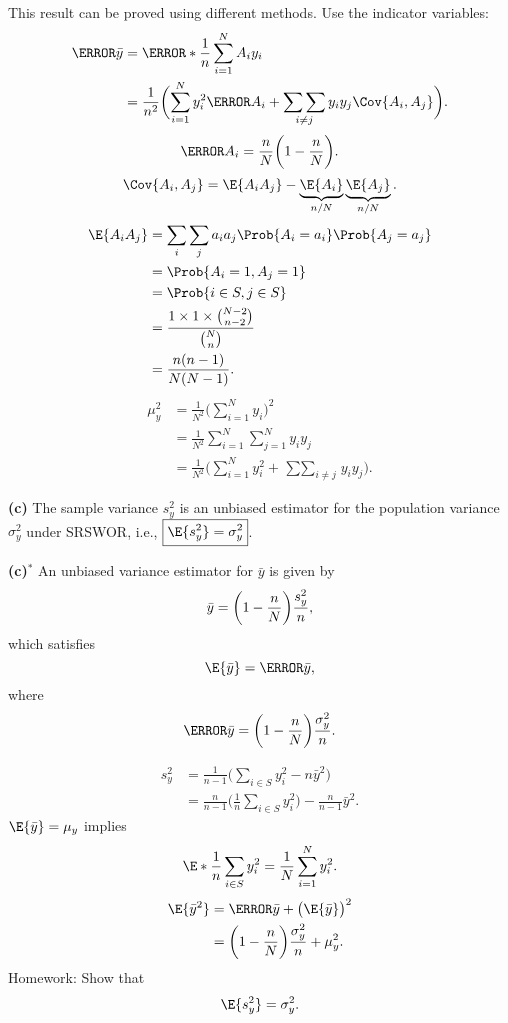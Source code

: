 This result can be proved using different methods. Use the indicator variables:
\begin{align*}
      \V{\bar{y}}
       & =\V*{\frac{1}{n}\sum_{i=1}^N A_i y_i}                                                                   \\
       & =\frac{1}{n^2}\biggl(\sum_{i=1}^{N}y_i^2\V{A_i}+ \mathop{\sum\sum}_{i\ne j}y_i y_j\Cov{A_i,A_j}\biggr).
\end{align*}
\[ \V{A_i}=\frac{n}{N}\biggl(1-\frac{n}{N}\biggr). \]
\[ \Cov{A_i,A_j} =\E{A_i A_j}-\underbrace{\E{A_i}}_{n/N}\underbrace{\E{A_j}}_{n/N}. \]
\begin{align*}
      \E{A_i A_j} & =\sum_i\sum_j a_i a_j \Prob{A_i=a_i}\Prob{A_j=a_j}     \\
                  & =\Prob{A_i=1,A_j=1}                                    \\
                  & =\Prob{i\in S,j\in S}                                  \\
                  & =\frac{1\times 1\times \binom{N-2}{n-2}}{\binom{N}{n}} \\
                  & =\frac{n(n-1)}{N(N-1)}.
\end{align*}
\begin{align*}
      \mu_y^2
       & =\frac{1}{N^2}\biggl(\sum_{i=1}^{N}y_i\biggr)^{\!2}                                \\
       & =\frac{1}{N^2}\sum_{i=1}^N \sum_{j=1}^{N}y_i y_j                                   \\
       & =\frac{1}{N^2}\biggl(\sum_{i=1}^{N}y_i^2+\mathop{\sum\sum}_{i\ne j}y_i y_j\biggr).
\end{align*}

\textbf{(c)} The sample variance $ s_y^2 $ is an unbiased estimator for the
population variance $ \sigma_y^2 $ under SRSWOR, i.e.,
$ \boxed{\E{s_y^2}=\sigma_y^2} $.

\textbf{(c)$^*$} An unbiased variance estimator for $ \bar{y} $ is given by
\[ \relax{\bar{y}}=\biggl(1-\frac{n}{N}\biggr)\frac{s_y^2}{n}, \]
which satisfies
\[ \E{\v{\bar{y}}}=\V{\bar{y}}, \]
where
\[ \V{\bar{y}}=\biggl(1-\frac{n}{N}\biggr)\frac{\sigma_y^2}{n}. \]

\begin{align*}
      s_y^2 & =\frac{1}{n-1}\biggl(\sum_{i\in S}y_i^2-n\bar{y}^2\biggr)                         \\
            & =\frac{n}{n-1}\biggl(\frac{1}{n}\sum_{i\in S}y_i^2\biggr)-\frac{n}{n-1}\bar{y}^2.
\end{align*}
$ \E{\bar{y}}=\mu_y $ implies
\[ \E*{\frac{1}{n}\sum_{i\in S}y_i^2}=\frac{1}{N}\sum_{i=1}^N y_i^2. \]
\begin{align*}
      \E{\bar{y}^2}
       & =\V{\bar{y}}+\bigl(\E{\bar{y}}\bigr)^2                    \\
       & =\biggl(1-\frac{n}{N}\biggr)\frac{\sigma_y^2}{n}+\mu_y^2.
\end{align*}
Homework: Show that
\[ \E{s_y^2}=\sigma_y^2. \]

